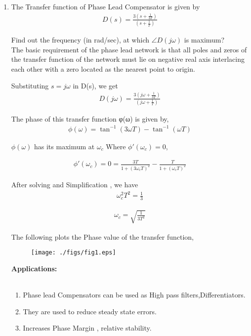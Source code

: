 \begin{enumerate}[label=\thesection.\arabic*.,ref=\thesection.\theenumi]
\item 
The Transfer function of Phase Lead Compensator is given by \\

\begin{align}
D(s) = \frac{3(s+\frac{1}{3T})}{(s+\frac{1}{T})}
\end{align}

Find out the frequency (in rad/sec), at which $\angle D(j\omega)$ is maximum? \\

\solution
The basic requirement of the phase lead network is that all poles and zeros
of the transfer function of the network must lie on negative real axis
interlacing each other with a zero located as the nearest point to origin.

Substituting $s = j\omega$ in D(s), we get \\

\begin{align}
D(j\omega) = \frac{3(j\omega+\frac{1}{3T})}{(j\omega+\frac{1}{T})}
\end{align}

The phase of this transfer function φ(ω) is given by,
\begin{align}
\phi(\omega) = \tan^{-1}(3\omega T)-\tan^{-1}(\omega T)
\end{align}

$\phi(\omega)$ has its maximum at $\omega_c$ Where $\phi '(\omega_c)=0$,

\begin{align}
\phi '(\omega_c) = 0 = \frac{3T}{1+(3\omega _c T)^2}-\frac{T}{1+(\omega _c T)^2}
\end{align}

After solving and Simplification , we have \\

\begin{align}
\omega _c ^2T^2 = \frac{1}{3}
\end{align}

\begin{align}
\omega _c = \sqrt{\frac{1}{3T^2}}
\end{align}

The following plots the Phase value of the transfer function, 

\begin{figure}[htp]
	\centering
	\texttt{[image: ./figs/fig1.eps]}
	\caption{}
	\label{fig:Phase}
\end{figure}
 
\textbf{Applications:}\\ \\
\begin{enumerate}
  \item Phase lead Compensators can be used as High pass filters,Differentiators.
  \item They are used to reduce steady state errors. 
  \item Increases Phase Margin , relative stability.
\end{enumerate}



\end{enumerate}


